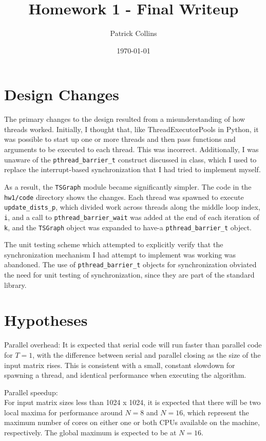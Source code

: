 \documentclass{article}
\begin{document}
\title{Homework 1 - Final Writeup}
\author{Patrick Collins}
\date{\today}
\maketitle

\section{Design Changes}
The primary changes to the design resulted from a misunderstanding of
how threads worked. Initially, I thought that, like
ThreadExecutorPools in Python, it was possible to start up one or more
threads and then pass functions and arguments to be executed to each
thread. This was incorrect. Additionally, I was unaware of the
\texttt{pthread\_barrier\_t} construct discussed in class, which I
used to replace the interrupt-based synchronization that I had tried
to implement myself. 

As a result, the \texttt{TSGraph} module became significantly
simpler. The code in the \texttt{hw1/code} directory shows the
changes. Each thread was spawned to execute \texttt{update\_dists\_p},
which divided work across threads along the middle loop index,
\texttt{i}, and a call to \texttt{pthread\_barrier\_wait} was added at
the end of each iteration of \texttt{k}, and the \texttt{TSGraph}
object was expanded to have-a \texttt{pthread\_barrier\_t} object. 

The unit testing scheme which attempted to explicitly verify that the
synchronization mechanism I had attempt to implement was working was
abandoned. The use of \texttt{pthread\_barrier\_t} objects for
synchronization obviated the need for unit testing of synchronization,
since they are part of the standard library. 

\section{Hypotheses}
Parallel overhead: It is expected that serial code will run faster
than parallel code for $T = 1$, with the difference between serial and
parallel closing as the size of the input matrix rises. This is
consistent with a small, constant slowdown for spawning a thread, and
identical performance when executing the algorithm.

Parallel speedup: \\
For input matrix sizes less than 1024 x 1024, it is expected that
there will be two local maxima for performance around  $N = 8$ and $N
= 16$, which represent the maximum number of cores on either one or
both CPUs available on the machine, respectively. The global maximum
is expected to be at $N = 16$. \\ \bigskip
\end{document}
